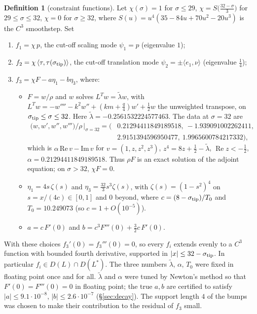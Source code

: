 \documentclass[11pt]{amsart}
\theoremstyle{definition}
\newtheorem{definition}[theorem]{Definition}
\theoremstyle{remark}
\newcommand{\ip}[2]{\langle #1,#2\rangle}
\newcommand{\re}{\operatorname{Re}}
\newcommand{\stip}{\sigma_{\rm tip}}
\begin{document}
\begin{definition}[constraint functions]\label{def:f}
Let $\chi(\sigma)=1$ for $\sigma\le29$, $\chi=S\big(\frac{32-\sigma}{3}\big)$ for $29\le\sigma\le32$, $\chi=0$ for $\sigma\ge32$, where $S(u)=u^4(35-84u+70u^2-20u^3)$ is the $C^3$ smoothstep. Set
\begin{enumerate}
\item $f_1=\chi\,p$, the cut-off scaling mode $\psi_1=p$ (eigenvalue $1$);
\item $f_2=\chi\,\ip{\tau}{\tau(\stip)}$, the cut-off translation mode $\psi_2=\pm\ip{e_1}{\nu}$ (eigenvalue $\frac14$);
\item $f_3=\chi F-a\eta_1-b\eta_3$, where:
 \begin{itemize}
 \item $F=w/\rho$ and $w$ solves $L^{T}w=\tilde\lambda w$, with $L^{T}w=-w''''-k^2w''+(km+\frac q4)w'+\frac12w$ the unweighted transpose, on $\stip\le\sigma\le32$. Here $\tilde\lambda=-0.2561532224577463$. The data at $\sigma=32$ are
\begin{align*}
\big(w,w',w'',w'''\big)/\rho\,\big|_{\sigma=32}=\big(&0.21294411849189518,\ -1.939091002262411,\\ &2.9151394596950477,\ 1.9965600784217332\big),
\end{align*}
which is $\alpha\,\mathrm{Re}\,v-\mathrm{Im}\,v$ for $v=(1,z,z^2,z^3)$, $z^4=8z+\frac12-\tilde\lambda$, $\re z<-\frac12$, $\alpha=0.21294411849189518$. Thus $\rho F$ is an exact solution of the adjoint equation; on $\sigma>32$, $\chi F=0$.
 \item $\eta_1=4s\,\zeta(s)$ and $\eta_3=\frac{32}{3} s^3\zeta(s)$, with $\zeta(s)=(1-s^2)^4$ on $s=x/(4c)\in[0,1]$ and $0$ beyond, where $c=(8-\stip)/T_0$ and $T_0=10.249073$ (so $c=1+O(10^{-5})$).
 \item $a=c\,F'(0)$ and $b=c^3F'''(0)+\frac32c\,F'(0)$.
 \end{itemize}
\end{enumerate}
\end{definition}

With these choices $f_3'(0)=f_3'''(0)=0$, so every $f_i$ extends evenly to a $C^3$ function with bounded fourth derivative, supported in $|x|\le32-\stip$. In particular $f_i\in D(L)\cap D(L^*)$. The three numbers $\tilde\lambda$, $\alpha$, $T_0$ were fixed in floating point once and for all. $\tilde\lambda$ and $\alpha$ were tuned by Newton's method so that $F'(0)=F'''(0)=0$ in floating point; the true $a,b$ are certified to satisfy $|a|\le9.1\cdot10^{-8}$, $|b|\le2.6\cdot10^{-7}$ (\S\ref{sec:decay}). The support length $4$ of the bumps was chosen to make their contribution to the residual of $f_3$ small.
\end{document}
